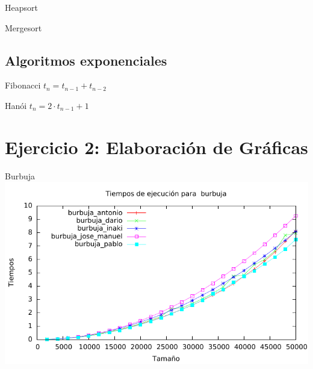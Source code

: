 \documentclass[10pt,compress,usetitleprogressbar,mathserif]{beamer}
\begin{document}
\begin{frame}{Heapsort}
	\resizebox{\linewidth}{!}{
		\hspace{1cm}
		
	}
\end{frame}

\begin{frame}{Mergesort}
	\resizebox{\linewidth}{!}{
		\hspace{1cm}
		
	}
\end{frame}
\subsection{Algoritmos exponenciales}

\begin{frame}{Fibonacci $t_n=t_{n-1}+t_{n-2}$}
	\resizebox{\linewidth}{!}{
		\hspace{1cm}
		
	}
\end{frame}

\begin{frame}{Hanói $t_n=2 \cdot t_{n-1}+1 $}
	\resizebox{\linewidth}{!}{
		\hspace{1cm}
		
	}
\end{frame}

\section{Ejercicio 2: \large{Elaboración de Gráficas}}

\begin{frame}{Burbuja}
	\includegraphics[width = \textwidth ]{burbuja_todos_g}
\end{frame}
\end{document}
